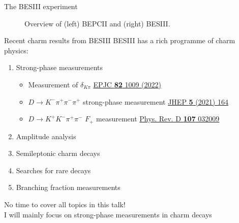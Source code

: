 \documentclass{beamer}
\begin{document}
\begin{frame}{The BESIII experiment}
\begin{figure}
\begin{subfigure}{0.5\textwidth}
    \end{subfigure}
    \caption*{Overview of (left) BEPCII and (right) BESIII.}
  \end{figure}
\end{frame}

\begin{frame}{Recent charm results from BESIII}
  \vspace{0.0cm}
  {\large BESIII has a rich programme of charm physics:}
  \begin{enumerate}
    \item{Strong-phase measurements}
    \begin{itemize}
      \item{Measurement of $\delta_{K\pi}$ \href{https://link.springer.com/article/10.1140/epjc/s10052-022-10872-2}{EPJC \textbf{82} 1009 (2022)}}
      \item{$D\to K^-\pi^+\pi^-\pi^+$ strong-phase measurement \href{https://link.springer.com/article/10.1007/JHEP05(2021)164}{JHEP \textbf{5} (2021) 164}}
      \item{$D\to K^+K^-\pi^+\pi^-$ $F_+$ measurement \href{https://journals.aps.org/prd/abstract/10.1103/PhysRevD.107.032009}{Phys. Rev. D \textbf{107} 032009}}
    \end{itemize}
    \item{Amplitude analysis}
    \item{Semileptonic charm decays}
    \item{Searches for rare decays}
    \item{Branching fraction measurements}
  \end{enumerate}
  \begin{center}
    {\Large No time to cover all topics in this talk!\\
      I will mainly focus on strong-phase measurements in charm decays}
  \end{center}
\end{frame}
\end{document}
